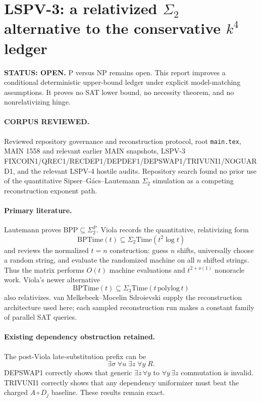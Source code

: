 \documentclass[11pt]{article}
\begin{document}
\section*{LSPV-3: a relativized $\Sigma_2$ alternative to the conservative $k^4$ ledger}
\textbf{STATUS: OPEN.} P versus NP remains open. This report improves a conditional deterministic upper-bound ledger under explicit model-matching assumptions. It proves no SAT lower bound, no necessity theorem, and no nonrelativizing hinge.

\paragraph{CORPUS REVIEWED.}
Reviewed repository governance and reconstruction protocol, root \texttt{main.tex}, MAIN 1558 and relevant earlier MAIN snapshots, LSPV-3 FIXCOIN1/QREC1/RECDEP1/DEPDEF1/DEPSWAP1/TRIVUNI1/NOGUARD1, and the relevant LSPV-4 hostile audits. Repository search found no prior use of the quantitative Sipser--G\'acs--Lautemann $\Sigma_2$ simulation as a competing reconstruction exponent path.

\paragraph{Primary literature.}
Lautemann proves $\mathrm{BPP}\subseteq\Sigma_2^P$. Viola records the quantitative, relativizing form
\[
\mathrm{BPTime}(t)\subseteq\Sigma_2\mathrm{Time}(t^2\log t)
\]
and reviews the normalized $t=n$ construction: guess $n$ shifts, universally choose a random string, and evaluate the randomized machine on all $n$ shifted strings. Thus the matrix performs $O(t)$ machine evaluations and $t^{2+o(1)}$ nonoracle work. Viola's newer alternative
\[
\mathrm{BPTime}(t)\subseteq\Sigma_3\mathrm{Time}(t\,\mathrm{polylog}\,t)
\]
also relativizes. van Melkebeek--Mocelin Sdroievski supply the reconstruction architecture used here; each sampled reconstruction run makes a constant family of parallel SAT queries.

\paragraph{Existing dependency obstruction retained.}
The post-Viola late-substitution prefix can be
\[
\exists\sigma\;\forall u\;\exists z\;\forall y\;R.
\]
DEPSWAP1 correctly shows that generic $\exists z\,\forall y$ to $\forall y\,\exists z$ commutation is invalid. TRIVUNI1 correctly shows that any dependency uniformizer must beat the charged $A\circ D_j$ baseline. These results remain exact.
\end{document}
